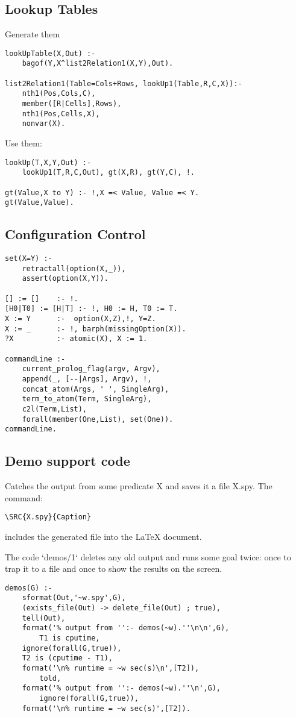 \subsection{ Lookup Tables 
}
 Generate them  \begin{Verbatim}
lookUpTable(X,Out) :-
	bagof(Y,X^list2Relation1(X,Y),Out).

list2Relation1(Table=Cols+Rows, lookUp1(Table,R,C,X)):-
	nth1(Pos,Cols,C),
	member([R|Cells],Rows),
	nth1(Pos,Cells,X),
	nonvar(X).
\end{Verbatim}
 Use them:  \begin{Verbatim}
lookUp(T,X,Y,Out) :-
	lookUp1(T,R,C,Out), gt(X,R), gt(Y,C), !.

gt(Value,X to Y) :- !,X =< Value, Value =< Y.
gt(Value,Value).
\end{Verbatim}
\subsection{ Configuration Control }\begin{Verbatim}
set(X=Y) :-
	retractall(option(X,_)),
	assert(option(X,Y)).

[] := []    :- !.
[H0|T0] := [H|T] :- !, H0 := H, T0 := T.
X := Y      :-  option(X,Z),!, Y=Z.
X := _      :- !, barph(missingOption(X)).
?X          :- atomic(X), X := 1.

commandLine :-
	current_prolog_flag(argv, Argv),
	append(_, [--|Args], Argv), !,
	concat_atom(Args, ' ', SingleArg),
	term_to_atom(Term, SingleArg),
	c2l(Term,List),
	forall(member(One,List), set(One)).
commandLine.
\end{Verbatim}
\subsection{ Demo support code
}

Catches the output from some predicate X
and saves it a file X.spy. The command:

{\scriptsize
\begin{verbatim}
\SRC{X.spy}{Caption}
\end{verbatim}}
\noindent
includes the generated file into the {\LaTeX} document.

The code `demos/1` deletes any old output and runs some goal twice: once
to trap it to a file and once to show the results on the screen.  \begin{Verbatim}
demos(G) :-
	sformat(Out,'~w.spy',G),
	(exists_file(Out) -> delete_file(Out) ; true),
	tell(Out),
	format('% output from '':- demos(~w).''\n\n',G),
        T1 is cputime,
	ignore(forall(G,true)),
	T2 is (cputime - T1),
	format('\n% runtime = ~w sec(s)\n',[T2]),
        told,
	format('% output from '':- demos(~w).''\n',G),  
        ignore(forall(G,true)),
	format('\n% runtime = ~w sec(s)',[T2]).
\end{Verbatim}
